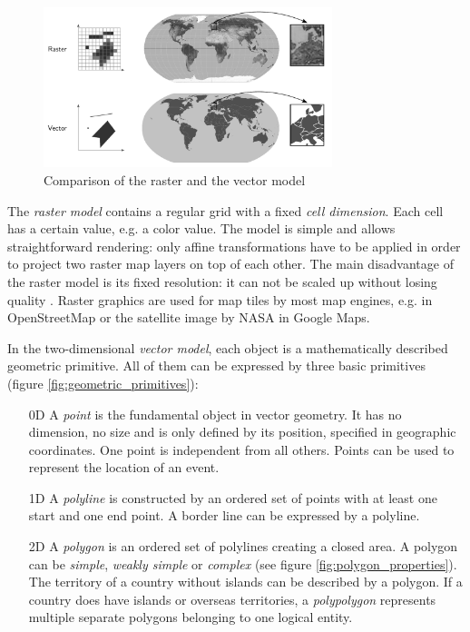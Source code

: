 \begin{figure}[H]
  \centering
  \includegraphics[width=0.75\textwidth]{graphics/basics/raster_vector}
  \caption{Comparison of the raster and the vector model}
  \label{fig:raster_vector}
\end{figure}

The \emph{raster model} contains a regular grid with a fixed \emph{cell dimension}. Each cell has a certain value, e.g. a color value.
The model is simple and allows straightforward rendering: only affine transformations have to be applied in order to project two raster map layers on top of each other. The main disadvantage of the raster model is its fixed resolution: it can not be scaled up without losing quality
\cite[pp.42-48]{bolstad2008gis}.
Raster graphics are used for map tiles by most map engines, e.g. in OpenStreetMap or the satellite image by NASA in Google Maps.

In the two-dimensional \emph{vector model}, each object is a mathematically described geometric primitive. All of them can be expressed by three basic primitives (figure \ref{fig:geometric_primitives}):
\begin{enumerate}
  \item[0D] A \emph{point} is the fundamental object in vector geometry. It has no dimension, no size and is only defined by its position, specified in geographic coordinates. One point is independent from all others. Points can be used to represent the location of an event.
  \item[1D] A \emph{polyline} is constructed by an ordered set of points with at least one start and one end point. A border line can be expressed by a polyline.
  \item[2D] A \emph{polygon} is an ordered set of polylines creating a closed area. A polygon can be \emph{simple}, \emph{weakly simple} or \emph{complex} (see figure \ref{fig:polygon_properties}). The territory of a country without islands can be described by a polygon. If a country does have islands or overseas territories, a \emph{polypolygon} represents multiple separate polygons belonging to one logical entity.
\end{enumerate}


